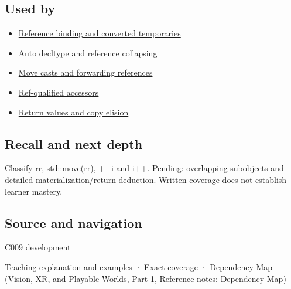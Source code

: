 \subsection{Used by}\label{appendix-1121b30eaeb0-used-by}

\hypertarget{appendix-1121b30eaeb0-used-by}{}

\begin{itemize}
\tightlist
\item
  \hyperref[appendix-37856d997bb0]{Reference binding and converted temporaries}
\item
  \hyperref[appendix-5d4252a42886]{Auto decltype and reference collapsing}
\item
  \hyperref[appendix-0104b704fb11]{Move casts and forwarding references}
\item
  \hyperref[appendix-d42039b1d6f7]{Ref-qualified accessors}
\item
  \hyperref[appendix-b08d3788c5c6]{Return values and copy elision}
\end{itemize}

\subsection{Recall and next depth}\label{appendix-1121b30eaeb0-recall-and-next-depth}

\hypertarget{appendix-1121b30eaeb0-recall-and-next-depth}{}

Classify rr, std::move(rr), ++i and i++. Pending: overlapping subobjects and detailed materialization/return deduction. Written coverage does not establish learner mastery.

\subsection{Source and navigation}\label{appendix-1121b30eaeb0-source-and-navigation}

\hypertarget{appendix-1121b30eaeb0-source-and-navigation}{}

\hyperref[appendix-fd090d982a15-m009---parts-127-147]{C009 development}

\hyperref[01-foundations-i-ch003-an-expression-has-a-type-and-a-category]{Teaching explanation and examples} · \hyperref[appendix-fd090d982a15-m008---parts-113-126]{Exact coverage} · \href{../07-Vision-XR-and-Playable-Worlds-P01/main.pdf\#nameddest=appendix-4ad47bdd269a}{Dependency Map (Vision, XR, and Playable Worlds, Part 1, Reference notes: Dependency Map)}
